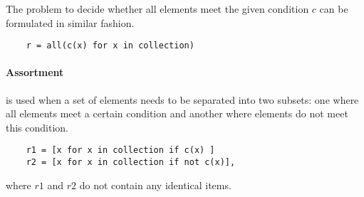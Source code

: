 The problem to decide whether all elements meet the given condition \( c \) can
be formulated in similar fashion.

\begin{listing}[H]
\begin{verbatim}
    r = all(c(x) for x in collection)
\end{verbatim}
\end{listing}

\paragraph{Assortment}
is used when a set of elements needs to be separated into two subsets: one where
all elements meet a certain condition and another where elements do not meet
this condition.
\begin{listing}[H]
\begin{verbatim}
    r1 = [x for x in collection if c(x) ]
    r2 = [x for x in collection if not c(x)],
\end{verbatim}
\end{listing}
where \( r1 \) and \( r2 \) do not contain any identical items.